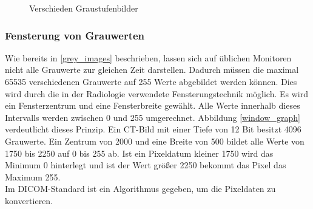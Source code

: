 \begin{figure}[htb]
\centering
{}
\caption{Verschieden Graustufenbilder}
\label{grey}
\end{figure}

\FloatBarrier
\subsubsection{Fensterung von Grauwerten} \label{windowing}

Wie bereits in \ref{grey_images} beschrieben, lassen sich auf üblichen Monitoren nicht alle Grauwerte zur gleichen Zeit darstellen. Dadurch müssen die maximal 65535 verschiedenen Grauwerte auf 255 Werte abgebildet werden können. Dies wird durch die in der Radiologie verwendete Fensterungstechnik möglich\cite[Kapitel 8, Seite 249]{handels:mbv}. Es wird ein Fensterzentrum und eine Fensterbreite gewählt. Alle Werte innerhalb dieses Intervalls werden zwischen 0 und 255 umgerechnet. Abbildung \ref{window_graph} verdeutlicht dieses Prinzip. Ein CT-Bild mit einer Tiefe von 12 Bit besitzt 4096 Grauwerte. Ein Zentrum von 2000 und eine Breite von 500 bildet alle Werte von 1750 bis 2250 auf 0 bis 255 ab. Ist ein Pixeldatum kleiner 1750 wird das Minimum 0 hinterlegt und ist der Wert größer 2250 bekommt das Pixel das Maximum 255.\\
Im DICOM-Standard ist ein Algorithmus gegeben, um die Pixeldaten zu konvertieren\cite[C.11.2.1.2]{dicom:iod}.


